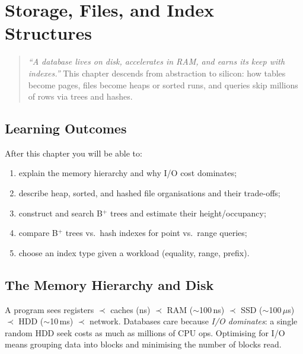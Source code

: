 \chapter{Storage, Files, and Index Structures}
\label{ch:storage}

\begin{quote}
\emph{``A database lives on disk, accelerates in RAM, and earns its keep with indexes.''} This chapter descends from abstraction to silicon: how tables become pages, files become heaps or sorted runs, and queries skip millions of rows via trees and hashes.
\end{quote}

\noindent{}
\vspace{0.4em}

\section*{Learning Outcomes}
After this chapter you will be able to:
\begin{enumerate}[label=(L\arabic*)]
    \item explain the memory hierarchy and why I/O cost dominates;
    \item describe heap, sorted, and hashed file organisations and their trade-offs;
    \item construct and search B$^+$ trees and estimate their height/occupancy;
    \item compare B$^+$ trees vs.\ hash indexes for point vs.\ range queries;
    \item choose an index type given a workload (equality, range, prefix).
\end{enumerate}

\section{The Memory Hierarchy and Disk}
\label{sec:memory-hierarchy}

A program sees registers $\prec$ caches (ns) $\prec$ RAM ($\sim$100\,ns) $\prec$ SSD ($\sim$100\,$\mu$s) $\prec$ HDD ($\sim$10\,ms) $\prec$ network. Databases care because \emph{I/O dominates}: a single random HDD seek costs as much as millions of CPU ops. Optimising for I/O means grouping data into blocks and minimising the number of blocks read.

